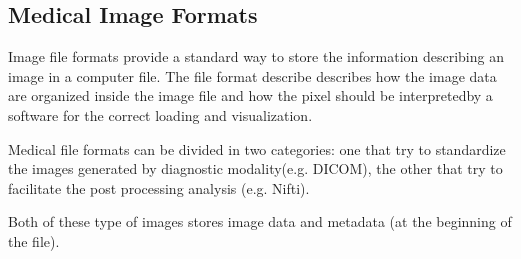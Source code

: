\documentclass{standalone}
\begin{document}
	\subsection{Medical Image Formats}
	
	Image file formats provide a standard way to store the information describing an image in a computer file. The file format describe describes how the image data are organized inside the image file and how the pixel should be interpretedby a software for the correct loading and visualization.
	
	Medical file formats can be divided in two categories: one that try to standardize the images generated by diagnostic modality(e.g. DICOM), the other that try to facilitate the post processing analysis (e.g. Nifti). 
	
	Both of these type of images stores image data and metadata (at the beginning of the file). 
\end{document}
